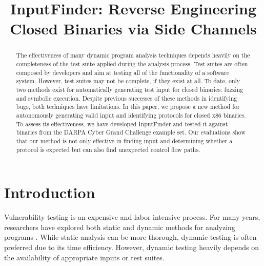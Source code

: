 \documentclass{acm_proc_article-sp}
\def \tool {InputFinder}
\begin{document}
\title{InputFinder: Reverse Engineering Closed Binaries via Side Channels}
\maketitle

\begin{abstract}
The effectiveness of many dynamic program analysis techniques depends heavily on the completeness of the test suite applied during the analysis process.
Test suites are often composed by developers and aim at testing all of the functionality of a software system.
However, test suites may not be complete, if they exist at all.
To date, only two methods exist for automatically generating test input for closed binaries: fuzzing and symbolic execution.
Despite previous successes of these methods in identifying bugs, both techniques have limitations.
In this paper, we propose a new method for autonomously generating valid input and identifying protocols for closed x86 binaries.
To assess its effectiveness, we have developed \tool{} and tested it against binaries from the DARPA Cyber Grand Challenge example set.
Our evaluations show that our method is not only effective in finding input and determining whether a protocol is expected but can also find unexpected control flow paths.
\end{abstract}

\section{Introduction}
Vulnerability testing is an expensive and labor intensive process.
For many years, researchers have explored both static and dynamic methods for analyzing programs \cite{smartfuzzer}.
While static analysis can be more thorough, dynamic testing is often preferred due to its time efficiency.
However, dynamic testing heavily depends on the availability of appropriate inputs or test suites.
\end{document}
